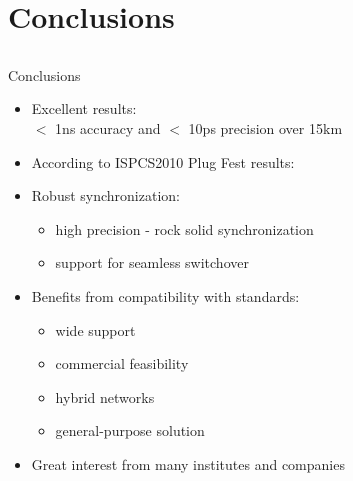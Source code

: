 \documentclass[compress,red]{beamer}
\begin{document}
\section{Conclusions}
\subsection{}
\begin{frame}{Conclusions}

    \begin{itemize}
	\item Excellent results:\\ $<$ 1ns accuracy and $<$ 10ps precision over 15km
	\item According to ISPCS2010 Plug Fest results:\\
	\begin{center}
	{\it \color{red}{White Rabbit is the most accurate \\PTP implementation in the World !}}
	\end{center}
	\item Robust synchronization:
	  \begin{itemize}
	    \item high precision - rock solid synchronization
	    \item support for seamless switchover 
	  \end{itemize}
	\item Benefits from compatibility with standards:
	  \begin{itemize}
	    \item wide support
	    \item commercial feasibility
	    \item hybrid networks
	    \item general-purpose solution
	  \end{itemize}
	\item Great interest from many institutes and companies	
      \end{itemize}


\end{frame}
\section{}
\end{document}
